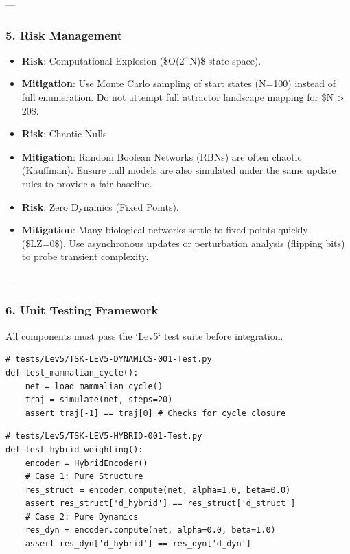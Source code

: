 \documentclass{article}
\begin{document}
---

\subsubsection{5. Risk Management}

\begin{itemize}
\item   \textbf{Risk}: Computational Explosion (\$O(2^N)\$ state space).
\item   \textbf{Mitigation}: Use Monte Carlo sampling of start states (N=100) instead of full enumeration. Do not attempt full attractor landscape mapping for \$N > 20\$.
\item   \textbf{Risk}: Chaotic Nulls.
\item   \textbf{Mitigation}: Random Boolean Networks (RBNs) are often chaotic (Kauffman). Ensure null models are also simulated under the same update rules to provide a fair baseline.
\item   \textbf{Risk}: Zero Dynamics (Fixed Points).
\item   \textbf{Mitigation}: Many biological networks settle to fixed points quickly (\$LZ=0\$). Use asynchronous updates or perturbation analysis (flipping bits) to probe transient complexity.
\end{itemize}

---

\subsubsection{6. Unit Testing Framework}

All components must pass the `Lev5` test suite before integration.

\begin{verbatim}# tests/Lev5/TSK-LEV5-DYNAMICS-001-Test.py
def test_mammalian_cycle():
    net = load_mammalian_cycle()
    traj = simulate(net, steps=20)
    assert traj[-1] == traj[0] # Checks for cycle closure
\end{verbatim}

\begin{verbatim}# tests/Lev5/TSK-LEV5-HYBRID-001-Test.py
def test_hybrid_weighting():
    encoder = HybridEncoder()
    # Case 1: Pure Structure
    res_struct = encoder.compute(net, alpha=1.0, beta=0.0)
    assert res_struct['d_hybrid'] == res_struct['d_struct']
    # Case 2: Pure Dynamics
    res_dyn = encoder.compute(net, alpha=0.0, beta=1.0)
    assert res_dyn['d_hybrid'] == res_dyn['d_dyn']
\end{verbatim}
\end{document}

